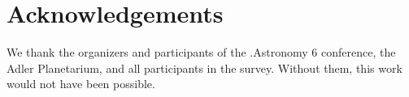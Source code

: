 \section{Acknowledgements}

We thank the organizers and participants of the .Astronomy 6 conference, the Adler Planetarium, and all participants in the survey.  Without them, this work would not have been possible.
  